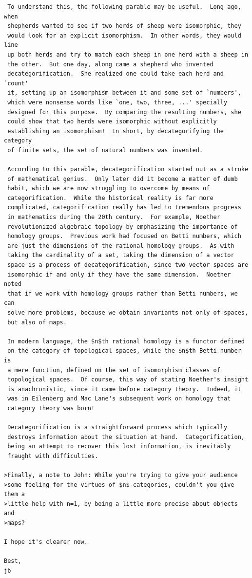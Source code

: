 \documentclass{article}
\begin{document}
\begin{verbatim}
 To understand this, the following parable may be useful.  Long ago, when
 shepherds wanted to see if two herds of sheep were isomorphic, they
 would look for an explicit isomorphism.  In other words, they would line
 up both herds and try to match each sheep in one herd with a sheep in
 the other.  But one day, along came a shepherd who invented
 decategorification.  She realized one could take each herd and `count'
 it, setting up an isomorphism between it and some set of `numbers',
 which were nonsense words like `one, two, three, ...' specially
 designed for this purpose.  By comparing the resulting numbers, she
 could show that two herds were isomorphic without explicitly
 establishing an isomorphism!  In short, by decategorifying the category
 of finite sets, the set of natural numbers was invented.   

 According to this parable, decategorification started out as a stroke
 of mathematical genius.  Only later did it become a matter of dumb
 habit, which we are now struggling to overcome by means of
 categorification.  While the historical reality is far more
 complicated, categorification really has led to tremendous progress 
 in mathematics during the 20th century.  For example, Noether
 revolutionized algebraic topology by emphasizing the importance of
 homology groups.  Previous work had focused on Betti numbers, which
 are just the dimensions of the rational homology groups.  As with
 taking the cardinality of a set, taking the dimension of a vector
 space is a process of decategorification, since two vector spaces are
 isomorphic if and only if they have the same dimension.  Noether noted
 that if we work with homology groups rather than Betti numbers, we can
 solve more problems, because we obtain invariants not only of spaces,
 but also of maps.  

 In modern language, the $n$th rational homology is a functor defined
 on the category of topological spaces, while the $n$th Betti number is
 a mere function, defined on the set of isomorphism classes of
 topological spaces.  Of course, this way of stating Noether's insight
 is anachronistic, since it came before category theory.  Indeed, it
 was in Eilenberg and Mac Lane's subsequent work on homology that
 category theory was born!
 
 Decategorification is a straightforward process which typically
 destroys information about the situation at hand.  Categorification,
 being an attempt to recover this lost information, is inevitably
 fraught with difficulties.

>Finally, a note to John: While you're trying to give your audience
>some feeling for the virtues of $n$-categories, couldn't you give them a
>little help with n=1, by being a little more precise about objects and
>maps?

I hope it's clearer now.   

Best,
jb
\end{verbatim}
\end{document}

